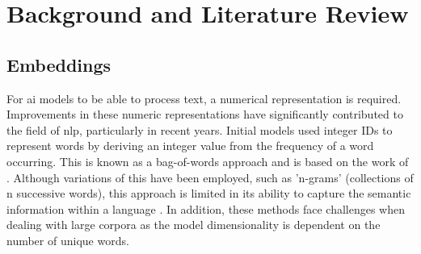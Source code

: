 \chapter{Background and Literature Review}
\label{ch:background}

\section{Embeddings}\label{sec:embeddings}
For \acrshort{ai} models to be able to process text, a numerical representation is required. Improvements in these numeric representations have significantly contributed to the field of \acrfull{nlp}, particularly in recent years. Initial models used integer IDs to represent words by deriving an integer value from the frequency of a word occurring. This is known as a bag-of-words approach and is based on the work of \citet{Zellig}. Although variations of this have been employed, such as 'n-grams' (collections of n successive words), this approach is limited in its ability to capture the semantic information within a language \citep{Monisha}. In addition, these methods face challenges when dealing with large corpora as the model dimensionality is dependent on the number of unique words. 

